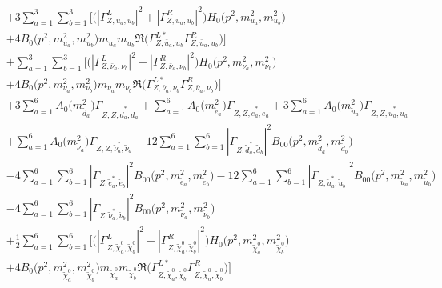 \begin{itemize}
\begin{align}
 &+3 \sum_{a=1}^{3}\sum_{b=1}^{3} \Big[\Big(|{\Gamma^L_{Z,\bar{u}_{{a}},u_{{b}}}}|^2 + |{\Gamma^R_{Z,\bar{u}_{{a}},u_{{b}}}}|^2\Big){H_0\Big(p^{2},m^2_{u_{{a}}},m^2_{u_{{b}}}\Big)} \nonumber \\ & +4 {B_0\Big(p^{2},m^2_{u_{{a}}},m^2_{u_{{b}}}\Big)} m_{u_{{a}}} m_{u_{{b}}} {\Re\Big({\Gamma^{L*}_{Z,\bar{u}_{{a}},u_{{b}}}} {\Gamma^R_{Z,\bar{u}_{{a}},u_{{b}}}} \Big)} \Big] \nonumber \\ 
 &+\sum_{a=1}^{3}\sum_{b=1}^{3} \Big[\Big(|{\Gamma^L_{Z,\bar{\nu}_{{a}},\nu_{{b}}}}|^2 + |{\Gamma^R_{Z,\bar{\nu}_{{a}},\nu_{{b}}}}|^2\Big){H_0\Big(p^{2},m^2_{\nu_{{a}}},m^2_{\nu_{{b}}}\Big)} \nonumber \\ & +4 {B_0\Big(p^{2},m^2_{\nu_{{a}}},m^2_{\nu_{{b}}}\Big)} m_{\nu_{{a}}} m_{\nu_{{b}}} {\Re\Big({\Gamma^{L*}_{Z,\bar{\nu}_{{a}},\nu_{{b}}}} {\Gamma^R_{Z,\bar{\nu}_{{a}},\nu_{{b}}}} \Big)} \Big]\nonumber \\ 
 &+3 \sum_{a=1}^{6}{A_0\Big(m^2_{\tilde{d}_{{a}}}\Big)} {\Gamma_{Z,Z,\tilde{d}^*_{{a}},\tilde{d}_{{a}}}}  +\sum_{a=1}^{6}{A_0\Big(m^2_{\tilde{e}_{{a}}}\Big)} {\Gamma_{Z,Z,\tilde{e}^*_{{a}},\tilde{e}_{{a}}}} +3 \sum_{a=1}^{6}{A_0\Big(m^2_{\tilde{u}_{{a}}}\Big)} {\Gamma_{Z,Z,\tilde{u}^*_{{a}},\tilde{u}_{{a}}}}  \nonumber \\ 
 &+\sum_{a=1}^{6}{A_0\Big(m^2_{\tilde{\nu}_{{a}}}\Big)} {\Gamma_{Z,Z,\tilde{\nu}^*_{{a}},\tilde{\nu}_{{a}}}} -12 \sum_{a=1}^{6}\sum_{b=1}^{6}|{\Gamma_{Z,\tilde{d}^*_{{a}},\tilde{d}_{{b}}}}|^2 {B_{00}\Big(p^{2},m^2_{\tilde{d}_{{a}}},m^2_{\tilde{d}_{{b}}}\Big)}  \nonumber \\ 
 &-4 \sum_{a=1}^{6}\sum_{b=1}^{6}|{\Gamma_{Z,\tilde{e}^*_{{a}},\tilde{e}_{{b}}}}|^2 {B_{00}\Big(p^{2},m^2_{\tilde{e}_{{a}}},m^2_{\tilde{e}_{{b}}}\Big)}  -12 \sum_{a=1}^{6}\sum_{b=1}^{6}|{\Gamma_{Z,\tilde{u}^*_{{a}},\tilde{u}_{{b}}}}|^2 {B_{00}\Big(p^{2},m^2_{\tilde{u}_{{a}}},m^2_{\tilde{u}_{{b}}}\Big)}  \nonumber \\ 
 &-4 \sum_{a=1}^{6}\sum_{b=1}^{6}|{\Gamma_{Z,\tilde{\nu}^*_{{a}},\tilde{\nu}_{{b}}}}|^2 {B_{00}\Big(p^{2},m^2_{\tilde{\nu}_{{a}}},m^2_{\tilde{\nu}_{{b}}}\Big)}  \nonumber \\ 
 &+\frac{1}{2} \sum_{a=1}^{6}\sum_{b=1}^{6} \Big[\Big(|{\Gamma^L_{Z,\tilde{\chi}^0_{{a}},\tilde{\chi}^0_{{b}}}}|^2 + |{\Gamma^R_{Z,\tilde{\chi}^0_{{a}},\tilde{\chi}^0_{{b}}}}|^2\Big){H_0\Big(p^{2},m^2_{\tilde{\chi}^0_{{a}}},m^2_{\tilde{\chi}^0_{{b}}}\Big)} \nonumber \\ & +4 {B_0\Big(p^{2},m^2_{\tilde{\chi}^0_{{a}}},m^2_{\tilde{\chi}^0_{{b}}}\Big)} m_{\tilde{\chi}^0_{{a}}} m_{\tilde{\chi}^0_{{b}}} {\Re\Big({\Gamma^{L*}_{Z,\tilde{\chi}^0_{{a}},\tilde{\chi}^0_{{b}}}} {\Gamma^R_{Z,\tilde{\chi}^0_{{a}},\tilde{\chi}^0_{{b}}}} \Big)} \Big] \nonumber \\ 

\end{align}
\end{itemize}
